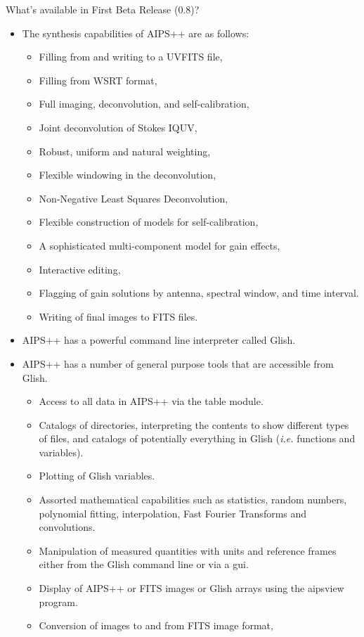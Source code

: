 \documentclass[11pt]{article}
\begin{document}
\begin{slide}{What's available in First Beta Release (0.8)?}
\begin{itemize}
\item The synthesis capabilities of AIPS++ are as follows:
\begin{itemize}
\item Filling from and writing to a UVFITS file,
\item Filling from WSRT format,
\item Full imaging, deconvolution, and self-calibration,
\item Joint deconvolution of Stokes IQUV,
\item Robust, uniform and natural weighting,
\item Flexible windowing in the deconvolution,
\item Non-Negative Least Squares Deconvolution,
\item Flexible construction of models for self-calibration,
\item A sophisticated multi-component model for gain effects,
\item Interactive editing,
\item Flagging of gain solutions by antenna, spectral window, and
time interval.
\item Writing of final images to FITS files.
\end{itemize}
\item AIPS++ has a powerful command line interpreter called Glish.
\item AIPS++ has a number of general purpose tools that are accessible
from Glish.
\begin{itemize}
\item Access to all data in AIPS++ via the table module.
\item Catalogs of directories, interpreting the contents to show 
different types of files, and catalogs of potentially everything in Glish
({\em i.e.} functions and variables).
\item Plotting of Glish variables.
\item Assorted mathematical capabilities such as 
statistics, random numbers, polynomial fitting, interpolation,
Fast Fourier Transforms and convolutions.
\item Manipulation of measured quantities with units and reference
frames either from the Glish command line or via a gui.
\item Display of AIPS++ or FITS images or Glish arrays using the
aipsview program.
\item Conversion of images to and from FITS image format, 

\end{itemize}
\end{itemize}
\end{slide}
\end{document}
